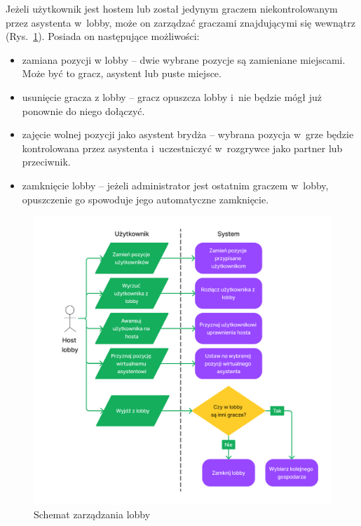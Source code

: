 Jeżeli użytkownik jest hostem lub został jedynym
graczem niekontrolowanym przez asystenta w~lobby, może on zarządzać graczami
znajdującymi się
wewnątrz (Rys.~\ref{fig:schemat_manage_lobby}). Posiada on następujące możliwości:
\begin{itemize}
  \item zamiana pozycji w lobby -- dwie wybrane pozycje są zamieniane miejscami.
        Może być to gracz, asystent lub puste miejsce.
  \item usunięcie gracza z lobby -- gracz opuszcza lobby i~nie będzie
        mógł już ponownie do niego dołączyć.
  \item zajęcie wolnej pozycji jako asystent brydża -- wybrana pozycja
        w~grze będzie kontrolowana przez asystenta
        i~uczestniczyć w~rozgrywce jako partner lub przeciwnik.
  \item zamknięcie lobby -- jeżeli administrator jest ostatnim
        graczem w~lobby, opuszczenie go spowoduje jego automatyczne
        zamknięcie.

\end{itemize}

\begin{figure}[h]
  \centering
  \includegraphics[width=\textwidth]{img/schematy/manage_lobby.png}
  \caption{Schemat zarządzania lobby}
  \label{fig:schemat_manage_lobby}
\end{figure}


